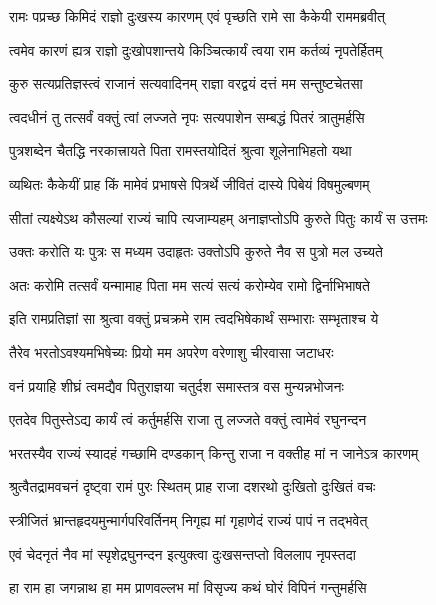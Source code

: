 \twolineshloka
{रामः पप्रच्छ किमिदं राज्ञो दुःखस्य कारणम्}
{एवं पृच्छति रामे सा कैकेयी राममब्रवीत्} %

\twolineshloka
{त्वमेव कारणं ह्यत्र राज्ञो दुःखोपशान्तये}
{किञ्चित्कार्यं त्वया राम कर्तव्यं नृपतेर्हितम्} %

\twolineshloka
{कुरु सत्यप्रतिज्ञस्त्वं राजानं सत्यवादिनम्}
{राज्ञा वरद्वयं दत्तं मम सन्तुष्टचेतसा} %

\twolineshloka
{त्वदधीनं तु तत्सर्वं वक्तुं त्वां लज्जते नृपः}
{सत्यपाशेन सम्बद्धं पितरं त्रातुमर्हसि} %

\twolineshloka
{पुत्रशब्देन चैतद्धि नरकात्त्रायते पिता}
{रामस्तयोदितं श्रुत्वा शूलेनाभिहतो यथा} %

\twolineshloka
{व्यथितः कैकेयीं प्राह किं मामेवं प्रभाषसे}
{पित्रर्थे जीवितं दास्ये पिबेयं विषमुल्बणम्} %

\twolineshloka
{सीतां त्यक्ष्येऽथ कौसल्यां राज्यं चापि त्यजाम्यहम्}
{अनाज्ञप्तोऽपि कुरुते पितुः कार्यं स उत्तमः} %

\twolineshloka
{उक्तः करोति यः पुत्रः स मध्यम उदाहृतः}
{उक्तोऽपि कुरुते नैव स पुत्रो मल उच्यते} %

\twolineshloka
{अतः करोमि तत्सर्वं यन्मामाह पिता मम}
{सत्यं सत्यं करोम्येव रामो द्विर्नाभिभाषते} %

\twolineshloka
{इति रामप्रतिज्ञां सा श्रुत्वा वक्तुं प्रचक्रमे}
{राम त्वदभिषेकार्थं सम्भाराः सम्भृताश्च ये} %

\twolineshloka
{तैरेव भरतोऽवश्यमभिषेच्यः प्रियो मम}
{अपरेण वरेणाशु चीरवासा जटाधरः} %

\twolineshloka
{वनं प्रयाहि शीघ्रं त्वमद्यैव पितुराज्ञया}
{चतुर्दश समास्तत्र वस मुन्यन्नभोजनः} %

\twolineshloka
{एतदेव पितुस्तेऽद्य कार्यं त्वं कर्तुमर्हसि}
{राजा तु लज्जते वक्तुं त्वामेवं रघुनन्दन} %


\twolineshloka
{भरतस्यैव राज्यं स्यादहं गच्छामि दण्डकान्}
{किन्तु राजा न वक्तीह मां न जानेऽत्र कारणम्} %

\twolineshloka
{श्रुत्वैतद्रामवचनं दृष्ट्वा रामं पुरः स्थितम्}
{प्राह राजा दशरथो दुःखितो दुःखितं वचः} %

\twolineshloka
{स्त्रीजितं भ्रान्तहृदयमुन्मार्गपरिवर्तिनम्}
{निगृह्य मां गृहाणेदं राज्यं पापं न तद्भवेत्} %

\twolineshloka
{एवं चेदनृतं नैव मां स्पृशेद्रघुनन्दन}
{इत्युक्त्वा दुःखसन्तप्तो विललाप नृपस्तदा} %

\twolineshloka
{हा राम हा जगन्नाथ हा मम प्राणवल्लभ}
{मां विसृज्य कथं घोरं विपिनं गन्तुमर्हसि} %

